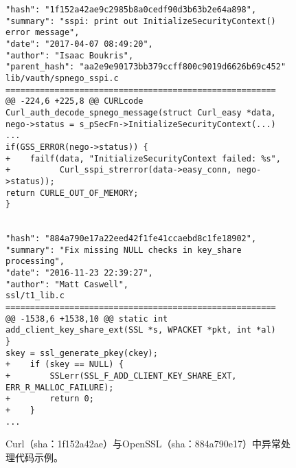 \begin{figure}[t]
	\centering
\begin{lstlisting}
"hash": "1f152a42ae9c2985b8a0cedf90d3b63b2e64a898",
"summary": "sspi: print out InitializeSecurityContext() error message",
"date": "2017-04-07 08:49:20",
"author": "Isaac Boukris",
"parent_hash": "aa2e9e90173bb379ccff800c9019d6626b69c452"
lib/vauth/spnego_sspi.c
=======================================================
@@ -224,6 +225,8 @@ CURLcode Curl_auth_decode_spnego_message(struct Curl_easy *data,
nego->status = s_pSecFn->InitializeSecurityContext(...)
...
if(GSS_ERROR(nego->status)) {
+    failf(data, "InitializeSecurityContext failed: %s",
+          Curl_sspi_strerror(data->easy_conn, nego->status));
return CURLE_OUT_OF_MEMORY;
}


"hash": "884a790e17a22eed42f1fe41ccaebd8c1fe18902",
"summary": "Fix missing NULL checks in key_share processing",
"date": "2016-11-23 22:39:27",
"author": "Matt Caswell",
ssl/t1_lib.c
=======================================================
@@ -1538,6 +1538,10 @@ static int add_client_key_share_ext(SSL *s, WPACKET *pkt, int *al)
}
skey = ssl_generate_pkey(ckey);
+    if (skey == NULL) {
+        SSLerr(SSL_F_ADD_CLIENT_KEY_SHARE_EXT, ERR_R_MALLOC_FAILURE);
+        return 0;
+    }
...
\end{lstlisting}
	\caption{
	Curl（sha：1f152a42ae）与OpenSSL（sha：884a790e17）中异常处理代码示例。
	}
	\label{fig:2-3-ieh-3}
\end{figure}